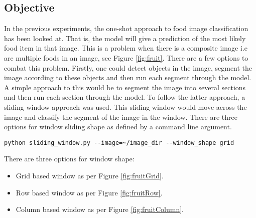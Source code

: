 \tocless\subsection{Objective}
In the previous experiments, the one-shot approach to food image
classification has been looked at. That is, the model will give a prediction of the most likely
food item in that image. This is a problem when there is a composite image i.e are multiple foods in an
image, see Figure \ref{fig:fruit}. There are a few options to combat this problem. Firstly, one could detect
objects in the image, segment the image according to these objects and then run
each segment through the model.
A simple approach to this would be to segment
the image into several sections and then run each section through the model.
To follow the latter approach, a sliding window approach was used. This
sliding window would move across the image and classify the segment of the image
in the window. There are three options for window sliding shape as defined by a
command line argument.

\begin{lstlisting}[style=Command]
python sliding_window.py --image=~/image_dir --window_shape grid
\end{lstlisting}

There are three options for window shape:
\begin{itemize}
	\item{Grid based window as per Figure \ref{fig:fruitGrid}}.
	\item{Row based window as per Figure \ref{fig:fruitRow}}.
	\item{Column based window as per Figure \ref{fig:fruitColumn}}.
\end{itemize}

